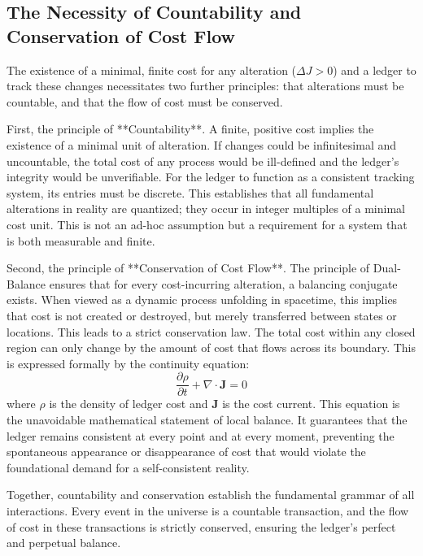 \documentclass[11pt,a4paper]{article}
\begin{document}
\subsection{The Necessity of Countability and Conservation of Cost Flow}
The existence of a minimal, finite cost for any alteration (\(\Delta J > 0\)) and a ledger to track these changes necessitates two further principles: that alterations must be countable, and that the flow of cost must be conserved.

First, the principle of **Countability**. A finite, positive cost implies the existence of a minimal unit of alteration. If changes could be infinitesimal and uncountable, the total cost of any process would be ill-defined and the ledger's integrity would be unverifiable. For the ledger to function as a consistent tracking system, its entries must be discrete. This establishes that all fundamental alterations in reality are quantized; they occur in integer multiples of a minimal cost unit. This is not an ad-hoc assumption but a requirement for a system that is both measurable and finite.

Second, the principle of **Conservation of Cost Flow**. The principle of Dual-Balance ensures that for every cost-incurring alteration, a balancing conjugate exists. When viewed as a dynamic process unfolding in spacetime, this implies that cost is not created or destroyed, but merely transferred between states or locations. This leads to a strict conservation law. The total cost within any closed region can only change by the amount of cost that flows across its boundary. This is expressed formally by the continuity equation:
\begin{equation}
\frac{\partial\rho}{\partial t} + \nabla \cdot \mathbf{J} = 0
\end{equation}
where \(\rho\) is the density of ledger cost and \(\mathbf{J}\) is the cost current. This equation is the unavoidable mathematical statement of local balance. It guarantees that the ledger remains consistent at every point and at every moment, preventing the spontaneous appearance or disappearance of cost that would violate the foundational demand for a self-consistent reality.

Together, countability and conservation establish the fundamental grammar of all interactions. Every event in the universe is a countable transaction, and the flow of cost in these transactions is strictly conserved, ensuring the ledger's perfect and perpetual balance.
\end{document}
